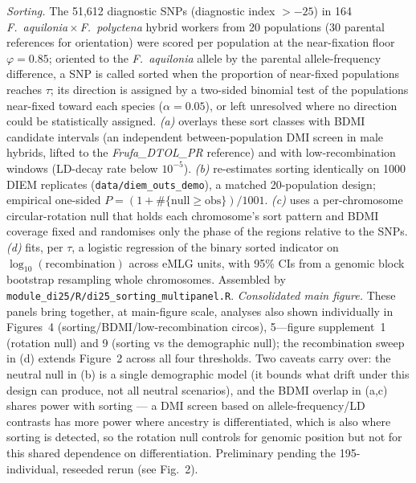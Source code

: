 \documentclass[11pt]{article}
\newcommand{\Faq}{\textit{F.~aquilonia}}
\newcommand{\Fpo}{\textit{F.~polyctena}}
\begin{document}
{%
\emph{Sorting.} The 51{,}612 diagnostic SNPs (diagnostic index $>-25$) in 164
\Faq{}\,$\times$\,\Fpo{} hybrid workers from 20 populations (30 parental references for orientation)
were scored per population at the near-fixation floor $\varphi=0.85$; oriented to the \Faq{} allele
by the parental allele-frequency difference, a SNP is called sorted when the proportion of
near-fixed populations reaches $\tau$; its direction is assigned by a two-sided binomial test of
the populations near-fixed toward each species ($\alpha=0.05$), or left unresolved where no
direction could be statistically assigned. \emph{(a)} overlays these sort classes with BDMI candidate intervals (an
independent between-population DMI screen in male hybrids, lifted to the \emph{Frufa\_DTOL\_PR}
reference) and with low-recombination windows (LD-decay rate below $10^{-5}$). \emph{(b)} re-estimates
sorting identically on 1000 DIEM replicates (\texttt{data/diem\_outs\_demo}), a matched 20-population
design; empirical one-sided $P=(1+\#\{\mathrm{null}\ge\mathrm{obs}\})/1001$. \emph{(c)} uses a
per-chromosome circular-rotation null that holds each chromosome's sort pattern and BDMI coverage
fixed and randomises only the phase of the regions relative to the SNPs. \emph{(d)} fits, per $\tau$,
a logistic regression of the binary sorted indicator on $\log_{10}(\text{recombination})$ across eMLG
units, with 95\% CIs from a genomic block bootstrap resampling whole chromosomes. Assembled by
\texttt{module\_di25/R/di25\_sorting\_multipanel.R}.}
{%
\emph{Consolidated main figure.} These panels bring together, at main-figure scale, analyses also
shown individually in Figures~4 (sorting/BDMI/low-recombination circos), 5---figure supplement~1
(rotation null) and 9 (sorting vs the demographic null); the recombination sweep in (d) extends
Figure~2 across all four thresholds. Two caveats carry over: the neutral null in (b) is a single
demographic model (it bounds what drift under this design can produce, not all neutral scenarios),
and the BDMI overlap in (a,c) shares power with sorting --- a DMI screen based on
allele-frequency/LD contrasts has more power where ancestry is differentiated, which is also where
sorting is detected, so the rotation null controls for genomic position but not for this shared
dependence on differentiation. Preliminary pending the 195-individual, reseeded rerun (see Fig.~2).}
\end{document}
